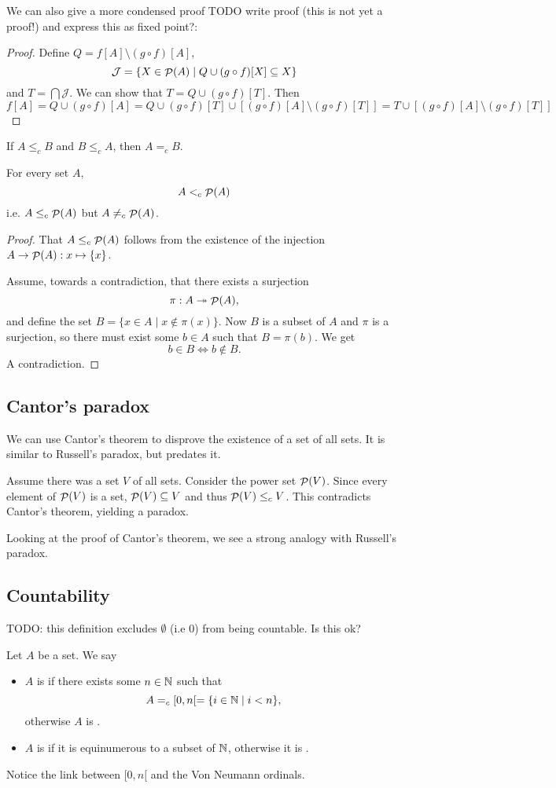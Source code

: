 We can also give a more condensed proof TODO write proof (this is not yet a proof!) and express this as fixed point?:
\begin{proof}
Define $Q = f[A]\setminus (g\circ f)[A]$,
\[ \mathcal{J} = \{ X\in \mathop{\mathcal{P}}(A)\;|\; Q\cup (g\circ f)[X] \subseteq X \} \]
and $T = \bigcap \mathcal{J}$. We can show that $T = Q\cup (g\circ f)[T]$. Then
\[ f[A] = Q\cup (g\circ f)[A] = Q\cup (g\circ f)[T]\cup [(g\circ f)[A]\setminus (g\circ f)[T]] = T\cup [(g\circ f)[A]\setminus (g\circ f)[T]] \]
\end{proof}
\begin{corollary}
If $A\leq_c  B$ and $B\leq_c A$, then $A=_c B$.
\end{corollary}

\begin{theorem} \label{theorem:Cantor}
For every set $A$,
\[ A <_c \mathop{\mathcal{P}}(A) \]
i.e. $A\leq_c \mathop{\mathcal{P}}(A)$ but $A\neq_c \mathop{\mathcal{P}}(A)$.
\end{theorem}
\begin{proof}
That $A\leq_c \mathop{\mathcal{P}}(A)$ follows from the existence of the injection $A\to \mathop{\mathcal{P}}(A): x\mapsto \{x\}$.

Assume, towards a contradiction, that there exists a surjection
\[ \pi: A\twoheadrightarrow \mathop{\mathcal{P}}(A), \]
and define the set $B = \{x \in A \;|\; x \notin \pi(x)\}$.
Now $B$ is a subset of $A$ and $\pi$ is a surjection, so there must exist some $b \in A$ such that $B = \pi(b)$. We get
\[ b \in B \iff b \notin B. \]
A contradiction.
\end{proof}


\subsection{Cantor's paradox}
We can use Cantor's theorem to disprove the existence of a set of all sets. It is similar to Russell's paradox, but predates it.

Assume there was a set $V$ of all sets. Consider the power set $\mathop{\mathcal{P}}(V)$. Since every element of $\mathop{\mathcal{P}}(V)$ is a set, $\mathop{\mathcal{P}}(V) \subseteq V$ and thus $\mathop{\mathcal{P}}(V) \leq_c V$. This contradicts Cantor's theorem, yielding a paradox.

Looking at the proof of Cantor's theorem, we see a strong analogy with Russell's paradox.

\subsection{Countability}
TODO: this definition excludes $\emptyset$ (i.e $0$) from being countable. Is this ok?
\begin{definition}
Let $A$ be a set. We say
\begin{itemize}
\item $A$ is  if there exists some $n\in \mathbb{N}$ such that
\[ A =_c [0, n[ = \{i\in \mathbb{N}\;|\; i<n\}, \]
otherwise $A$ is .
\item $A$ is  if it is equinumerous to a subset of $\mathbb{N}$, otherwise it is .
\end{itemize}
\end{definition}
Notice the link between $[0,n[$ and the Von Neumann ordinals.

